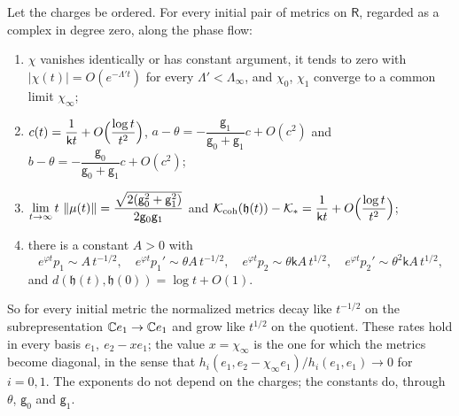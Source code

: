 \begin{proposition}\label{prop:semistable}
Let the charges be ordered. For every initial pair of metrics on
$\mathsf R$, regarded as a complex in degree zero, along the phase flow:
\begin{enumerate}
\item[(i)] $\chi$ vanishes identically or has constant argument, it tends to
 zero with $|\chi(t)|=O(e^{-\Lambda't})$ for every $\Lambda'<\Lambda_\infty$,
 and $\chi_0$, $\chi_1$ converge to a common limit $\chi_\infty$;
\item[(ii)] $c(t)=\dfrac1{\mathsf kt}+O\Bigl(\dfrac{\log t}{t^2}\Bigr)$,
 $a-\theta=-\dfrac{\mathsf g_1}{\mathsf g_0+\mathsf g_1}c+O(c^2)$ and
 $b-\theta=-\dfrac{\mathsf g_0}{\mathsf g_0+\mathsf g_1}c+O(c^2)$;
\item[(iii)] $\displaystyle\lim_{t\to\infty}t\,\left\lVert\mu(t)\right\rVert
 =\frac{\sqrt{2(\mathsf g_0^2+\mathsf g_1^2)}}{2\mathsf g_0\mathsf g_1}$ and
 $\mathcal K_{\mathrm{coh}}(\mathfrak h(t))-\mathcal K_*=\dfrac1{\mathsf kt}+O\Bigl(\dfrac{\log t}{t^2}\Bigr)$;
\item[(iv)] there is a constant $A>0$ with
 \[
 e^{\varphi t}p_1\sim A\,t^{-1/2},\quad e^{\varphi t}p_1'\sim\theta A\,t^{-1/2},\quad
 e^{\varphi t}p_2\sim\theta\mathsf kA\,t^{1/2},\quad
 e^{\varphi t}p_2'\sim\theta^2\mathsf kA\,t^{1/2},
 \]
 and $d(\mathfrak h(t),\mathfrak h(0))=\log t+O(1)$.
\end{enumerate}
\end{proposition}

So for every initial metric the normalized metrics decay like $t^{-1/2}$ on
the subrepresentation $\mathbb C e_1\to\mathbb C e_1$ and grow like $t^{1/2}$ on the
quotient. These rates hold in every basis $e_1,\ e_2-xe_1$; the value
$x=\chi_\infty$ is the one for which the metrics become diagonal, in the
sense that $h_i(e_1,e_2-\chi_\infty e_1)/h_i(e_1,e_1)\to0$ for $i=0,1$. The
exponents do not depend on the charges; the constants do, through $\theta$,
$\mathsf g_0$ and $\mathsf g_1$.

